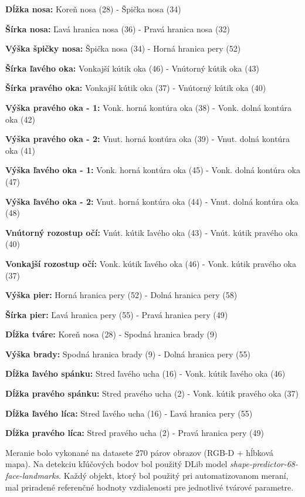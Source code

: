 \begin{compactitem}
	\item[\textbf{Dĺžka nosa:}] Koreň nosa (28) - Špička nosa (34)
	\item[\textbf{Šírka nosa:}] Ľavá hranica nosa (36) - Pravá hranica nosa (32)
	\item[\textbf{Výška špičky nosa:}] Špička nosa (34) - Horná hranica pery (52)
	\item[\textbf{Šírka ľavého oka:}] Vonkajší kútik oka (46) - Vnútorný kútik oka (43)
	\item[\textbf{Šírka pravého oka:}] Vonkajší kútik oka (37) - Vnútorný kútik oka (40)
	\item[\textbf{Výška pravého oka - 1:}] Vonk. horná kontúra oka (38) - Vonk. dolná kontúra oka (42)
	\item[\textbf{Výška pravého oka - 2:}] Vnut. horná kontúra oka (39) - Vnut. dolná kontúra oka (41)
	\item[\textbf{Výška ľavého oka - 1:}] Vonk. horná kontúra oka (45) - Vonk. dolná kontúra oka (47)
	\item[\textbf{Výška ľavého oka - 2:}] Vnut. horná kontúra oka (44) - Vnut. dolná kontúra oka (48)
	\item[\textbf{Vnútorný rozostup očí:}] Vnút. kútik ľavého oka (43) - Vnút. kútik pravého oka (40)
	\item[\textbf{Vonkajší rozostup očí:}] Vonk. kútik ľavého oka (46) - Vonk. kútik pravého oka (37)
	\item[\textbf{Výška pier:}] Horná hranica pery (52) - Dolná hranica pery (58)
	\item[\textbf{Šírka pier:}] Ľavá hranica pery (55) - Pravá hranica pery (49)
	\item[\textbf{Dĺžka tváre:}] Koreň nosa (28) - Spodná hranica brady (9)
	\item[\textbf{Výška brady:}] Spodná hranica brady (9) - Dolná hranica pery (55)
	\item[\textbf{Dĺžka ľavého spánku:}] Stred ľavého ucha (16) - Vonk. kútik ľavého oka (46)
	\item[\textbf{Dĺžka pravého spánku:}] Stred pravého ucha (2) - Vonk. kútik pravého oka (37)
	\item[\textbf{Dĺžka ľavého líca:}] Stred ľavého ucha (16) - Ľavá hranica pery (55)
	\item[\textbf{Dĺžka pravého líca:}] Stred pravého ucha (2) - Pravá hranica pery (49)
\end{compactitem}

\vskip 0.2in
Meranie bolo vykonané na datasete 270 párov obrazov (RGB-D + hĺbková mapa). Na detekciu kľúčových bodov bol použitý DLib model \textit{shape-predictor-68-face-landmarks}. Každý objekt, ktorý bol použitý pri automatizovanom meraní, mal priradené referenčné hodnoty vzdialenosti pre jednotlivé tvárové parametre. 


